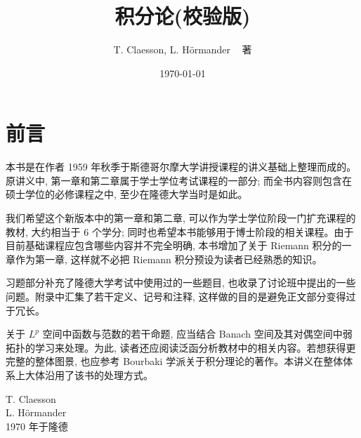 \documentclass{ctexbook}
\title{\bfseries 积分论(校验版)}
\author{T. Claesson, L. H\"ormander ~ 著}
\date{\today}
\numberwithin{equation}{chapter}
\theoremstyle{plain}
\theoremstyle{definition}
\theoremstyle{remark}
\begin{document}
	\frontmatter
	\maketitle
	
	\renewcommand\contentsname{目~录}
	\tableofcontents
	
	\mainmatter
	
	\chapter*{前言}
	
	本书是在作者 1959 年秋季于斯德哥尔摩大学讲授课程的讲义基础上整理而成的。原讲义中, 第一章和第二章属于学士学位考试课程的一部分; 而全书内容则包含在硕士学位的必修课程之中, 至少在隆德大学当时是如此。
	
	我们希望这个新版本中的第一章和第二章, 可以作为学士学位阶段一门扩充课程的教材, 大约相当于 \(6\) 个学分; 同时也希望本书能够用于博士阶段的相关课程。由于目前基础课程应包含哪些内容并不完全明确, 本书增加了关于 Riemann 积分的一章作为第一章, 这样就不必把 Riemann 积分预设为读者已经熟悉的知识。
	
	习题部分补充了隆德大学考试中使用过的一些题目, 也收录了讨论班中提出的一些问题。附录中汇集了若干定义、记号和注释, 这样做的目的是避免正文部分变得过于冗长。
	
	关于 \(L^p\) 空间中函数与范数的若干命题, 应当结合 Banach 空间及其对偶空间中弱拓扑的学习来处理。为此, 读者还应阅读泛函分析教材中的相关内容。若想获得更完整的整体图景, 也应参考 Bourbaki 学派关于积分理论的著作。本讲义在整体体系上大体沿用了该书的处理方式。
	
	\begin{flushright}
		T. Claesson\\
		L. H\"ormander\\
		1970 年于隆德
	\end{flushright}
	
	
	
	
	
	
	
	
	
\end{document}
